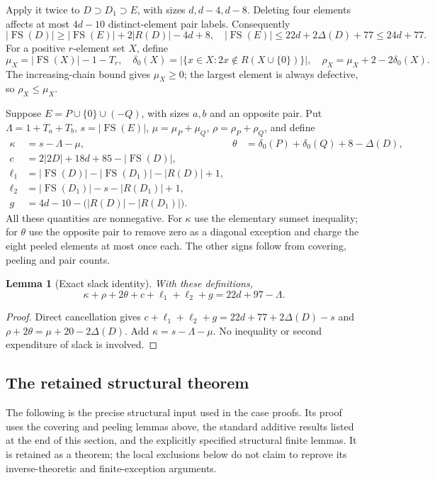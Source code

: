 \documentclass[11pt,letterpaper]{article}
\newcommand{\FS}{\operatorname{FS}}
\newcommand{\card}[1]{\lvert#1\rvert}
\newtheorem{lemma}[theorem]{Lemma}
\theoremstyle{definition}\newtheorem{definition}[theorem]{Definition}
\begin{document}
Apply it twice to $D\supset D_1\supset E$, with sizes $d,d-4,d-8$.
Deleting four elements affects at most $4d-10$ distinct-element pair
labels. Consequently
\[
\card{\FS(D)}\ge\card{\FS(E)}+2\card{R(D)}-4d+8,
\quad \card{\FS(E)}\le22d+2\Delta(D)+77\le24d+77.
\]
For a positive $r$-element set $X$, define
\[
\mu_X=\card{\FS(X)}-1-T_r,\quad
\delta_0(X)=\card{\{x\in X:2x\notin R(X\cup\{0\})\}},\quad
\rho_X=\mu_X+2-2\delta_0(X).
\]
The increasing-chain bound gives $\mu_X\ge0$; the largest element is
always defective, so $\rho_X\le\mu_X$.

Suppose $E=P\cup\{0\}\cup(-Q)$, with sizes $a,b$ and an opposite
pair. Put $\Lambda=1+T_a+T_b$, $s=\card{\FS(E)}$,
$\mu=\mu_P+\mu_Q$, $\rho=\rho_P+\rho_Q$, and define
\[
\begin{aligned}
\kappa&=s-\Lambda-\mu,&
\theta&=\delta_0(P)+\delta_0(Q)+8-\Delta(D),\\
c&=2\card{2D}+18d+85-\card{\FS(D)},\\
\ell_1&=\card{\FS(D)}-\card{\FS(D_1)}-\card{R(D)}+1,\\
\ell_2&=\card{\FS(D_1)}-s-\card{R(D_1)}+1,\\
g&=4d-10-\bigl(\card{R(D)}-\card{R(D_1)}\bigr).
\end{aligned}
\]
All these quantities are nonnegative. For $\kappa$ use the elementary
sumset inequality; for $\theta$ use the opposite pair to remove zero
as a diagonal exception and charge the eight peeled elements at most
once each. The other signs follow from covering, peeling and pair counts.

\begin{lemma}[Exact slack identity]\label{lem:common-budget}
With these definitions,
\begin{equation}\label{eq:common-budget}
\kappa+\rho+2\theta+c+\ell_1+\ell_2+g=22d+97-\Lambda.
\end{equation}
\end{lemma}
\begin{proof}
Direct cancellation gives
$c+\ell_1+\ell_2+g=22d+77+2\Delta(D)-s$ and
$\rho+2\theta=\mu+20-2\Delta(D)$.
Add $\kappa=s-\Lambda-\mu$. No inequality or second expenditure of
slack is involved.
\end{proof}

\subsection{The retained structural theorem}
The following is the precise structural input used in the case proofs.
Its proof uses the covering and peeling lemmas above, the standard
additive results listed at the end of this section, and the explicitly
specified structural finite lemmas. It is retained as a theorem; the
local exclusions below do not claim to reprove its inverse-theoretic
and finite-exception arguments.
\end{document}
